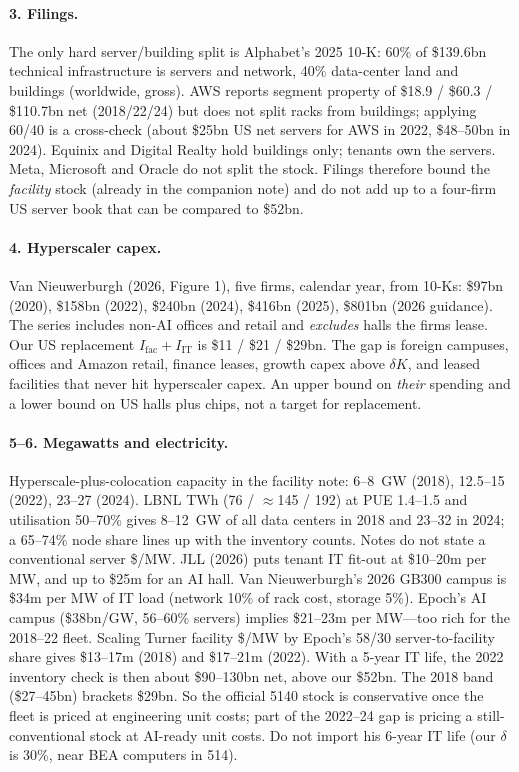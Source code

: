 \documentclass[11pt]{article}
\begin{document}
\paragraph{3. Filings.}
The only hard server/building split is Alphabet's 2025 10-K: 60\% of \$139.6bn technical infrastructure is servers and network, 40\% data-center land and buildings (worldwide, gross). AWS reports segment property of \$18.9 / \$60.3 / \$110.7bn net (2018/22/24) but does not split racks from buildings; applying 60/40 is a cross-check (about \$25bn US net servers for AWS in 2022, \$48--50bn in 2024). Equinix and Digital Realty hold buildings only; tenants own the servers. Meta, Microsoft and Oracle do not split the stock. Filings therefore bound the \emph{facility} stock (already in the companion note) and do not add up to a four-firm US server book that can be compared to \$52bn.

\paragraph{4. Hyperscaler capex.}
Van Nieuwerburgh (2026, Figure 1), five firms, calendar year, from 10-Ks: \$97bn (2020), \$158bn (2022), \$240bn (2024), \$416bn (2025), \$801bn (2026 guidance). The series includes non-AI offices and retail and \emph{excludes} halls the firms lease. Our US replacement $I_{\mathrm{fac}}+I_{\mathrm{IT}}$ is \$11 / \$21 / \$29bn. The gap is foreign campuses, offices and Amazon retail, finance leases, growth capex above $\delta K$, and leased facilities that never hit hyperscaler capex. An upper bound on \emph{their} spending and a lower bound on US halls plus chips, not a target for replacement.

\paragraph{5--6. Megawatts and electricity.}
Hyperscale-plus-colocation capacity in the facility note: 6--8~GW (2018), 12.5--15 (2022), 23--27 (2024). LBNL TWh (76 / $\approx$145 / 192) at PUE 1.4--1.5 and utilisation 50--70\% gives 8--12~GW of all data centers in 2018 and 23--32 in 2024; a 65--74\% node share lines up with the inventory counts. Notes do not state a conventional server \$/MW. JLL (2026) puts tenant IT fit-out at \$10--20m per MW, and up to \$25m for an AI hall. Van Nieuwerburgh's 2026 GB300 campus is \$34m per MW of IT load (network 10\% of rack cost, storage 5\%). Epoch's AI campus (\$38bn/GW, 56--60\% servers) implies \$21--23m per MW---too rich for the 2018--22 fleet. Scaling Turner facility \$/MW by Epoch's 58/30 server-to-facility share gives \$13--17m (2018) and \$17--21m (2022). With a 5-year IT life, the 2022 inventory check is then about \$90--130bn net, above our \$52bn. The 2018 band (\$27--45bn) brackets \$29bn. So the official 5140 stock is conservative once the fleet is priced at engineering unit costs; part of the 2022--24 gap is pricing a still-conventional stock at AI-ready unit costs. Do not import his 6-year IT life (our $\delta$ is 30\%, near BEA computers in 514).
\end{document}
